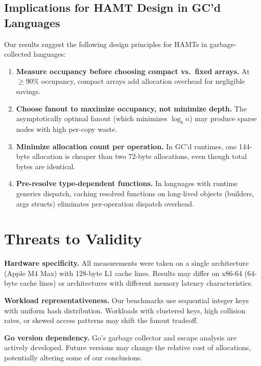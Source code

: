 \documentclass[11pt,twocolumn]{article}
\begin{document}
\subsection{Implications for HAMT Design in GC'd Languages}

Our results suggest the following design principles for HAMTs in
garbage-collected languages:

\begin{enumerate}[nosep]
  \item \textbf{Measure occupancy before choosing compact vs.\ fixed arrays.}
        At $\geq 90\%$ occupancy, compact arrays add allocation overhead
        for negligible savings.
  \item \textbf{Choose fanout to maximize occupancy, not minimize depth.}
        The asymptotically optimal fanout (which minimizes $\log_b n$) may
        produce sparse nodes with high per-copy waste.
  \item \textbf{Minimize allocation count per operation.}
        In GC'd runtimes, one 144-byte allocation is cheaper than two
        72-byte allocations, even though total bytes are identical.
  \item \textbf{Pre-resolve type-dependent functions.}
        In languages with runtime generics dispatch, caching resolved
        functions on long-lived objects (builders, args structs) eliminates
        per-operation dispatch overhead.
\end{enumerate}

\section{Threats to Validity}
\label{sec:threats}

\textbf{Hardware specificity.}
All measurements were taken on a single architecture (Apple M4 Max) with
128-byte L1 cache lines.
Results may differ on x86-64 (64-byte cache lines) or architectures with
different memory latency characteristics.

\textbf{Workload representativeness.}
Our benchmarks use sequential integer keys with uniform hash distribution.
Workloads with clustered keys, high collision rates, or skewed access
patterns may shift the fanout tradeoff.

\textbf{Go version dependency.}
Go's garbage collector and escape analysis are actively developed.
Future versions may change the relative cost of allocations, potentially
altering some of our conclusions.
\end{document}
